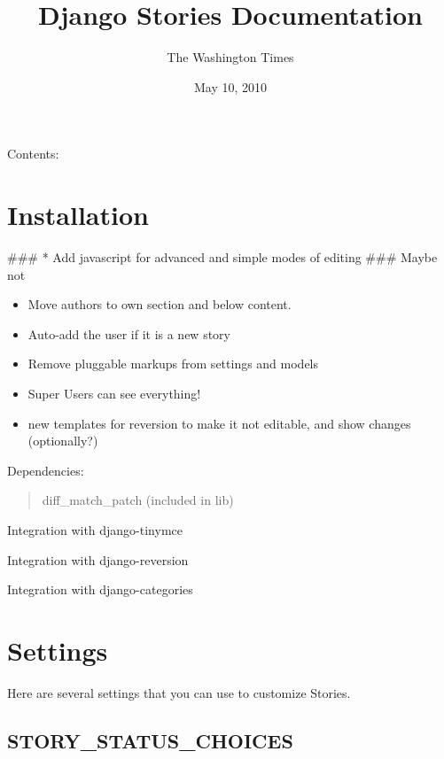 \documentclass[letterpaper,10pt,english]{manual}
\title{Django Stories Documentation}
\date{May 10, 2010}
\author{The Washington Times}
\begin{document}
\maketitle
\tableofcontents
\hypertarget{--doc-index}{}


Contents:

\resetcurrentobjects
\hypertarget{--doc-install}{}

\chapter{Installation}

\#\#\# * Add javascript for advanced and simple modes of editing \#\#\# Maybe not
\begin{itemize}
\item {} 
Move authors to own section and below content.

\item {} 
Auto-add the user if it is a new story

\item {} 
Remove pluggable markups from settings and models

\item {} 
Super Users can see everything!

\item {} 
new templates for reversion to make it not editable, and show changes (optionally?)

\end{itemize}

Dependencies:
\begin{quote}

diff\_match\_patch (included in lib)
\end{quote}

Integration with django-tinymce

Integration with django-reversion

Integration with django-categories

\resetcurrentobjects
\hypertarget{--doc-settings}{}

\hypertarget{settings}{}\chapter{Settings}

Here are several settings that you can use to customize Stories.


\hypertarget{story-status-choices}{}\section{STORY\_STATUS\_CHOICES}
\end{document}
